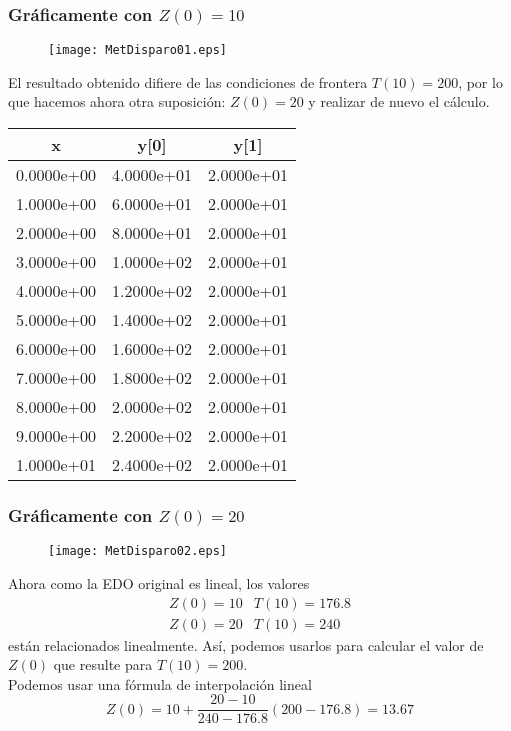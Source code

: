 \begin{frame}
\frametitle{Gr\'{a}ficamente con $Z(0)= 10$}
\begin{figure}
	\centering
	\texttt{[image: MetDisparo01.eps]} 
\end{figure}
\end{frame}
\begin{frame}
El resultado obtenido difiere de las condiciones de frontera $T(10)=200$, por lo que hacemos ahora otra suposici\'{o}n: $Z(0)=20$ y realizar de nuevo el c\'{a}lculo.
\end{frame}
\begin{frame}
\fontsize{12}{12}\selectfont
\begin{center}
\begin{tabular}{c | c | c}
x & y[0] & y[1] \\ \hline 
0.0000e+00 & 4.0000e+01 & 2.0000e+01 \\
1.0000e+00 & 6.0000e+01 & 2.0000e+01 \\
2.0000e+00 & 8.0000e+01 & 2.0000e+01 \\
3.0000e+00 & 1.0000e+02 & 2.0000e+01 \\
4.0000e+00 & 1.2000e+02 & 2.0000e+01 \\
5.0000e+00 & 1.4000e+02 & 2.0000e+01 \\
6.0000e+00 & 1.6000e+02 & 2.0000e+01 \\
7.0000e+00 & 1.8000e+02 & 2.0000e+01 \\
8.0000e+00 & 2.0000e+02 & 2.0000e+01 \\
9.0000e+00 & 2.2000e+02 & 2.0000e+01 \\
1.0000e+01 & 2.4000e+02 & 2.0000e+01 \\
\end{tabular}
\end{center}
\end{frame}
\begin{frame}
\frametitle{Gr\'{a}ficamente con $Z(0)= 20$}
\begin{figure}
	\centering
	\texttt{[image: MetDisparo02.eps]} 
\end{figure}
\end{frame}
\begin{frame}
Ahora como la EDO original es lineal, los valores
\[ \begin{matrix}
Z(0) = 10 & T(10) = 176.8 \\
Z(0) = 20 & T(10) = 240
\end{matrix} \]
est\'{a}n relacionados linealmente. As\'{i}, podemos usarlos para calcular el valor de $Z(0)$ que resulte para $T(10)=200$.
\\
\bigskip
Podemos usar una f\'{o}rmula de interpolaci\'{o}n lineal
\[ Z(0) =  10 + \dfrac{20-10}{240 - 176.8}(200-176.8) = 13.67 \]
\end{frame}
